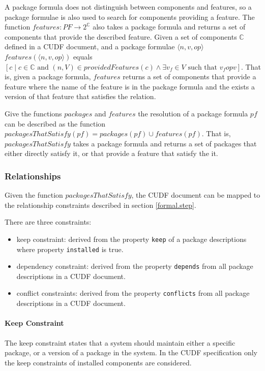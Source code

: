 A package formula does not distinguish between components and features, so a package formulae is also used to search for components providing a feature.
The function $features: PF \rightarrow 2^{\mathbb{C}}$ also takes a package formula and returns a set of components that provide the described feature.
Given a set of components $\mathbb{C}$ defined in a CUDF document, and a package formulae $\langle n,v,op\rangle$
$features(\langle n,v,op\rangle)$ equals 
$[c \mid c\in \mathbb{C} \mbox{ and } (n,V) \in providedFeatures(c) \wedge \exists v_f \in V \mbox { such that } v_f op v ]$.
That is, given a package formula, 
$features$ returns a set of components that provide a feature where the name of the feature is in the package formula and the exists a version of that feature that satisfies the relation. 

Give the functions $packages$ and $features$ the resolution of a package formula $pf$ can be described as the function $packagesThatSatisfy(pf) = packages(pf) \cup features(pf)$.
That is, $packagesThatSatisfy$ takes a package formula and returns a set of packages that either directly satisfy it, or that provide a feature that satisfy the it.

\subsubsection{Relationships}
Given the function $packagesThatSatisfy$, the CUDF document can be mapped to the relationship constraints described in section \ref{formal.step}.

There are three constraints:
\begin{itemize}
  \item keep constraint: derived from the property \verb+keep+ of a package descriptions where property \verb+installed+ is true.
  \item dependency constraint: derived from the property \verb+depends+ from all package descriptions in a CUDF document.
  \item conflict constraints: derived from the property \verb+conflicts+ from all package descriptions in a CUDF document.
\end{itemize}

\paragraph{Keep Constraint}
The keep constraint states that a system should maintain either a specific package, or a version of a package in the system.
In the CUDF specification only the keep constraints of installed components are considered.


